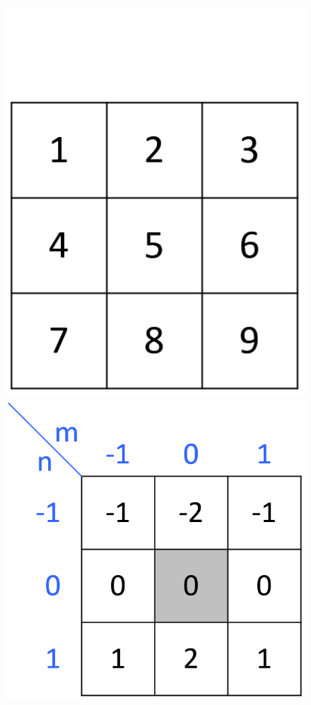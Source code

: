 \documentclass[twoside,twocolumn]{article}
\begin{document}
\begin{figure}[H]
\begin{center}
	\includegraphics[scale=.2]{figures/entrada.png}
	\includegraphics[scale=.2]{figures/filtro.png}

\end{center}
\end{figure}
\end{document}
